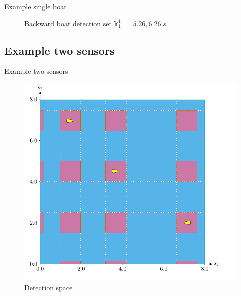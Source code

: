 \documentclass{beamer}
\begin{document}
\begin{frame}{Example single boat}
\begin{minipage}{0.45\textwidth}
\begin{figure}
                            \caption{Backward boat detection set $\mathbb{Y}_1^1 = \lbrack5.26, 6.26\rbrack s$}
                    \end{figure}
                \end{minipage}
            \end{frame}

        \subsection{Example two sensors}

            \begin{frame}{Example two sensors}
                \begin{minipage}{0.45\textwidth}
                    \begin{figure}
                            \includegraphics[width=\textwidth]{imgs/ex_detection_space}
                            \caption{Detection space}
                    \end{figure}
                \end{minipage}
                \hfill
                \begin{minipage}{0.45\textwidth}
                    \begin{figure}

\end{figure}
\end{minipage}
\end{frame}
\end{document}
